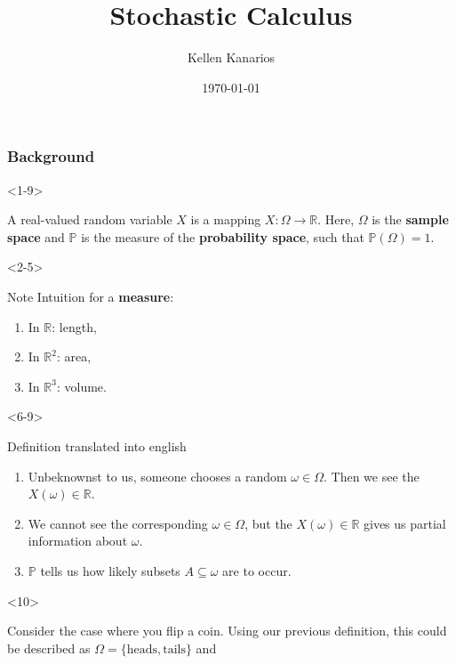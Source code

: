 \documentclass[10pt]{beamer}
\title{Stochastic Calculus}
\author{Kellen Kanarios}
\institute{University of Michigan}
\date{\today}
\begin{document}
\begin{frame}
\titlepage
\end{frame}

\begin{frame}[t]
  \frametitle{Background}
  \begin{onlyenv}<1-9>
    \begin{definition}
      A real-valued random variable $X$ is a mapping $X : \Omega \to \mathbb{R}$. Here, $\Omega$ is the \textbf{sample space} and $\mathbb{P}$ is the measure of the \textbf{probability space}, such that $\mathbb{P}(\Omega) = 1$.
    \end{definition}
  \end{onlyenv}
  \begin{onlyenv}<2-5>
      \begin{block}{Note}
        Intuition for a \textbf{measure}:
        \begin{enumerate}
          \item <3-> In $\mathbb{R}$: length,
          \item <4-> In $\mathbb{R}^2$: area,
          \item <5-> In $\mathbb{R}^3$: volume.
        \end{enumerate}
      \end{block}
  \end{onlyenv}
  \begin{onlyenv}<6-9>
      \begin{block}{Definition translated into english}
        \begin{enumerate}
          \item<7->
            Unbeknownst to us, someone chooses a random $\omega \in \Omega$. Then we see the $X(\omega) \in \mathbb{R}$.
          \item<8->
            We cannot see the corresponding $\omega \in \Omega$, but the $X(\omega) \in \mathbb{R}$ gives us partial information about $\omega$.
          \item<9-> $\mathbb{P}$ tells us how likely subsets $A \subseteq \omega$ are to occur.
        \end{enumerate}
      \end{block}
  \end{onlyenv}
  \begin{onlyenv}<10>
    \begin{example}
      Consider the case where you flip a coin. Using our previous definition, this could be described as $\Omega = \{\text{heads}, \text{tails}\}$ and \\

\end{example}
\end{onlyenv}
\end{frame}
\end{document}
